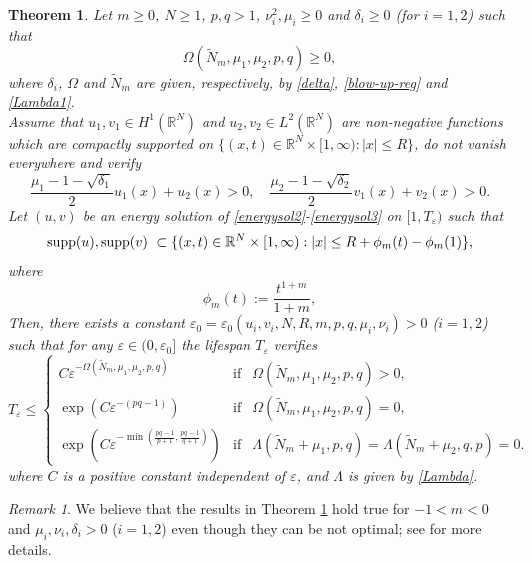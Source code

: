 \documentclass[12pt,leqno]{amsart}
\numberwithin{equation}{section}
\newtheorem{theo}{Theorem}[section]
\theoremstyle{remark}
\newtheorem{rem}{Remark}[section]
\newcommand{\de}{\delta}
\def\R{{\mathbb{R}}}
\def\e{{\varepsilon}}
\begin{document}
\begin{theo}
\label{blowup-equality}
Let $m\ge 0$,  $N \ge 1$, $p, q >1$, $\nu_i^2, \mu_i \ge 0$  and $\de_i \ge 0$ (for $i=1,2$)  such that 
\begin{equation}\label{assump}
\Omega(\tilde{N}_m,\mu_1,\mu_2, p,q) \ge 0,
\end{equation}
where $\de_i$,  $\Omega$ and $\tilde{N}_m$ are given, respectively, by \eqref{delta}, \eqref{blow-up-reg} and \eqref{Lambda1}.\\
Assume that  $u_1, v_1\in H^1(\R^N)$ and $u_2, v_2 \in L^2(\R^N)$ are non-negative functions which are compactly supported on  $\{(x,t)\in\R^N\times[1,\infty): |x|\le R\}$, 
do not vanish everywhere and verify
  \begin{equation}\label{hypfg}
  \frac{\mu_1-1-\sqrt{\de_1}}{2}u_1(x)+u_2(x) > 0, \quad \frac{\mu_2-1-\sqrt{\de_2}}{2}v_1(x)+v_2(x) > 0.
  \end{equation}
Let $(u,v)$ be an energy solution of \eqref{energysol2}-\eqref{energysol3} on $[1,T_\e)$ such that 
$$\mbox{\rm supp}(u), {\rm supp}(v)\ \subset \{(x,t)\in\R^N\times[1,\infty): |x|\le R+\phi_m(t)-\phi_m(1)\},$$
where 
\begin{equation}\label{xi}
\phi_{m}(t):=\frac{t^{1+m}}{1+m},
\end{equation} 
Then, there exists a constant $\e_0=\e_0(u_i,v_i,N,R,m,p,q,\mu_i,\nu_i)>0$ ($i=1,2$)
such that for any $\e \in (0,\e_0]$ the lifespan $T_\e$ verifies
\begin{equation}\label{Teps1}
T_\e \le \left\{
\begin{array}{lll}
C \e^{-\Omega(\tilde{N}_m,\mu_1,\mu_2,p,q)}& \text{if}&\Omega(\tilde{N}_m,\mu_1,\mu_2,p,q)>0,\\
\exp(C \e^{-(pq-1)})& \text{if}&\Omega(\tilde{N}_m,\mu_1,\mu_2,p,q)=0, \\
\exp(C \e^{-\min \left(\frac{pq-1}{p+1},\frac{pq-1}{q+1}\right)})& \text{if}&\Lambda(\tilde{N}_m+\mu_1,p,q)=\Lambda(\tilde{N}_m+\mu_2,q,p)=0.
\end{array}
\right.
\end{equation}
 where $C$ is a positive constant independent of $\e$,  and $\Lambda$ is given by \eqref{Lambda}.
\end{theo}




\begin{rem}
We believe that the results in Theorem \ref{blowup-equality} hold true for $-1<m<0$ and $\mu_i, \nu_i, \delta_i >0$ ($i=1,2$) even though they can be not optimal; see \cite{Tsutaya3} for more details. 
\end{rem}
\end{document}
